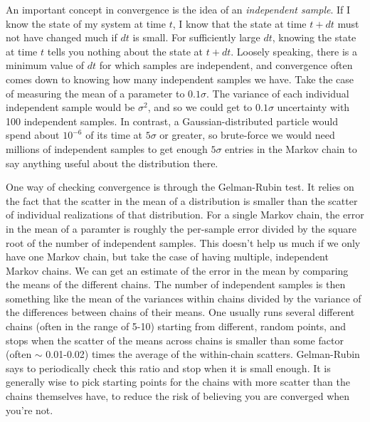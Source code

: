 \documentclass[letterpaper,11pt,preprint]{aastex}
\begin{document}
An important concept in convergence is the idea of an
\textit{independent sample}.  If I know the state of my system at time
$t$, I know that the state at time $t+dt$ must not have changed much
if $dt$ is small.  For sufficiently large $dt$, knowing the state at
time $t$ tells you nothing about the state at $t+dt$.  Loosely
speaking, there is a minimum value of $dt$ for which samples are
independent, and convergence often comes down to knowing how many
independent samples we have.  Take the case of measuring the mean of a
parameter to $0.1\sigma$.  The variance of each individual independent
sample would be $\sigma^2$, and so we could get to $0.1\sigma$
uncertainty with 100 independent samples. In contrast, a
Gaussian-distributed particle would spend about $10^{-6}$ of its time
at $5\sigma$ or greater, so brute-force we would need millions of
independent samples to get enough $5\sigma$ entries in the Markov
chain to say anything useful about the distribution there.  

One way of checking convergence is through the Gelman-Rubin test.  It
relies on the fact that the scatter in the mean of a distribution is
smaller than the scatter of individual realizations of that
distribution.  For a single Markov chain, the error in the mean of a
paramter is roughly the per-sample error divided by the square root of
the number of independent samples.  This doesn't help us much if we
only have one Markov chain, but take the case of having multiple,
independent Markov chains.  We can get an estimate of the error in the
mean by comparing the means of the different chains.  The number of
independent samples is then something like the mean of the variances
within chains divided by the variance of the differences between
chains of their means.  One usually runs several different chains
(often in the range of 5-10) starting from different, random points,
and stops when the scatter of the means across chains is smaller than
some factor (often $\sim$ 0.01-0.02) times the average of the
within-chain scatters.  Gelman-Rubin says to periodically check this
ratio and stop when it is small enough.  It is generally wise to pick
starting points for the chains with more scatter than the chains
themselves have, to reduce the risk of believing you are converged
when you're not.
\end{document}
